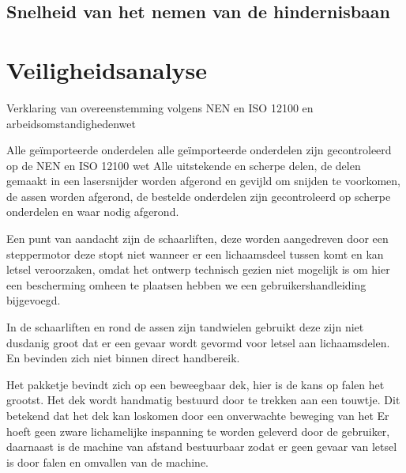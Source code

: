 \subsection{Snelheid van het nemen van de hindernisbaan}





\section{Veiligheidsanalyse}
\label{se:veiligheidsanalyse_prestatieverwachting}


 
Verklaring van overeenstemming volgens NEN en ISO 12100 en arbeidsomstandighedenwet
 \vspace{\baselineskip}

Alle geïmporteerde onderdelen alle geïmporteerde onderdelen zijn gecontroleerd op de NEN en ISO 12100 wet
Alle uitstekende en scherpe delen, de delen gemaakt in een lasersnijder worden afgerond en gevijld om snijden te voorkomen, de assen worden afgerond, de bestelde onderdelen zijn gecontroleerd op scherpe onderdelen en waar nodig afgerond.
\vspace{\baselineskip}

Een punt van aandacht zijn de schaarliften, deze worden aangedreven door een steppermotor deze stopt niet wanneer er een lichaamsdeel tussen komt en kan letsel veroorzaken, omdat het ontwerp technisch gezien niet mogelijk is om hier een bescherming omheen te plaatsen hebben we een gebruikershandleiding bijgevoegd. 
\vspace{\baselineskip}

In de schaarliften en rond de assen zijn tandwielen gebruikt deze zijn niet dusdanig groot dat er een gevaar wordt gevormd voor letsel aan lichaamsdelen. En bevinden zich niet binnen direct handbereik.
\vspace{\baselineskip}

Het pakketje bevindt zich op een beweegbaar dek, hier is de kans op falen het grootst. Het dek wordt handmatig bestuurd door te trekken aan een touwtje. Dit betekend dat het dek kan loskomen door een onverwachte beweging van het 
Er hoeft geen zware lichamelijke inspanning te worden geleverd door de gebruiker, daarnaast is de machine van afstand bestuurbaar zodat er geen gevaar van letsel is door falen en omvallen van de machine. 


